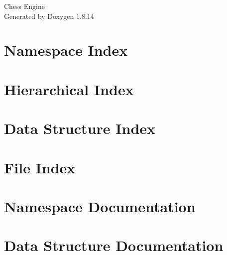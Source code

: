 \documentclass[twoside]{book}
\newcommand{\+}{\discretionary{\mbox{\scriptsize$\hookleftarrow$}}{}{}}
\newcommand{\clearemptydoublepage}{%
  \newpage{\pagestyle{empty}\cleardoublepage}%
}
\begin{document}
\hypersetup{pageanchor=false,
             bookmarksnumbered=true,
             pdfencoding=unicode
            }
\begin{titlepage}
\vspace*{7cm}
\begin{center}%
{\Large Chess Engine }\\
\vspace*{1cm}
{\large Generated by Doxygen 1.8.14}\\
\end{center}
\end{titlepage}
\clearemptydoublepage
{}
\tableofcontents
\clearemptydoublepage
{}
\hypersetup{pageanchor=true}

\chapter{Namespace Index}

\chapter{Hierarchical Index}

\chapter{Data Structure Index}

\chapter{File Index}

\chapter{Namespace Documentation}









\chapter{Data Structure Documentation}




















\end{document}

